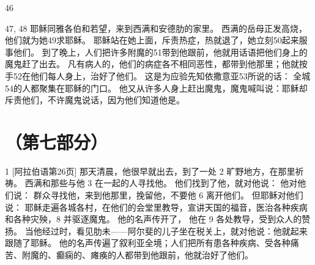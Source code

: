 46  \par

47, 48  耶稣同雅各伯和若望，来到西满和安德肋的家里。 西满的岳母正发高烧，他们就为她49求耶稣。 耶稣站在她上面，斥责热症，热就退了，她立刻50起来服事他们。 到了晚上，人们把许多附魔的51带到他跟前，他就用话语把他们身上的魔鬼赶了出去。 凡有病人的，他们的病症各不相同恶性，都带到他那里；他就按手52在他们每人身上，治好了他们。 这是为应验先知依撒意亚53所说的话： 全城54的人都聚集在耶稣的门口。 他又从许多人身上赶出魔鬼，魔鬼喊叫说：耶稣却斥责他们，不许魔鬼说话，因为他们知道他是。\par



\section{（第七部分）}

1 [阿拉伯语第26页]  那天清晨，他很早就出去，到了一处 2 旷野地方，在那里祈祷。 西满和那些与他 3 在一起的人寻找他。 他们找到了他，就对他说： 他对他们说： 群众寻找他，来到他那里，挽留他，不要他 6 离开他们。 但耶稣对他们说： 耶稣走遍各城各村，在他们的会堂里教导，宣讲天国的福音，医治各种疾病和各种灾殃，8  并驱逐魔鬼。 他的名声传开了， 他在 9 各处教导，受到众人的赞扬。 当他经过时，看见肋未——阿尔斐的儿子坐在税关上，就对他说：他就起来跟随了耶稣。 他的名声传遍了叙利亚全境；人们把所有患各种疾病、受各种痛苦、附魔的、癫痫的、瘫痪的人都带到他跟前，他就治好了他们。\par


